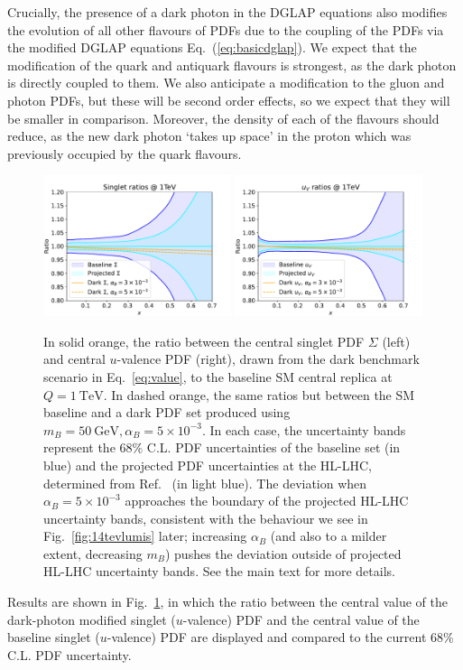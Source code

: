 \documentclass[withindex,glossary]{cam-thesis}
\begin{document}
Crucially, the presence of a dark photon in the DGLAP equations also
modifies the evolution of all other flavours of PDFs due to the
coupling of the PDFs via the modified DGLAP equations
Eq.~(\ref{eq:basicdglap}).
We expect that the modification of the quark and antiquark 
flavours is strongest, as the dark photon is directly coupled to
them. We also anticipate a modification to the gluon and photon
PDFs, but these will be second order effects, so we expect that they
will be smaller in comparison. Moreover, the density of each of the
flavours should reduce, as the new dark photon `takes up space' in the
proton which was previously occupied by the quark flavours.
\begin{figure}[tb]
\centering
\includegraphics[width=0.49\textwidth]{darkphoton_figures/singlet_ratios_1TeV.pdf}
\includegraphics[width=0.49\textwidth]{darkphoton_figures/uvalence_ratios_1TeV.pdf}
\caption{In solid orange, the ratio between the central singlet PDF $\Sigma$ (left) and central $u$-valence
  PDF (right), drawn from the dark benchmark scenario in Eq.~\eqref{eq:value}, 
  to the baseline SM central replica at $Q = 1\
  \text{TeV}$. In dashed orange, the same ratios but between the SM baseline and a dark PDF set
  produced using $m_B = 50\ \text{GeV}, \alpha_B = 5 \times 10^{-3}$. In each case, the uncertainty bands
  represent the 68\% C.L. PDF uncertainties of the baseline set (in blue) 
  and the projected PDF uncertainties at the HL-LHC, determined
  from Ref.~\cite{Khalek:2018} (in light blue). The deviation when $\alpha_B = 5 \times 10^{-3}$ approaches
  the boundary of the projected HL-LHC uncertainty bands, consistent with the behaviour we see in Fig.~\ref{fig:14tevlumis} later; increasing $\alpha_B$ (and also to a milder extent, decreasing $m_B$) pushes the deviation outside of projected HL-LHC uncertainty bands.
  See the main text for more details.}
\label{fig:ratio_quarks}
\end{figure}
Results are shown in Fig.~\ref{fig:ratio_quarks}, in which the ratio
between the central value of the dark-photon modified singlet
($u$-valence) PDF and the central value of the baseline singlet
($u$-valence) PDF are displayed and compared to the current 68\% C.L. PDF
uncertainty. 
\end{document}
